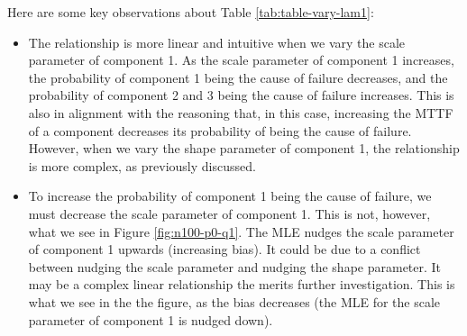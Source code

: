 \documentclass[
]{article}
\begin{document}
Here are some key observations about Table \ref{tab:table-vary-lam1}:

\begin{itemize}
\item
  The relationship is more linear and intuitive when we vary the scale
  parameter of component 1. As the scale parameter of component 1
  increases, the probability of component 1 being the cause of failure
  decreases, and the probability of component 2 and 3 being the cause of
  failure increases. This is also in alignment with the reasoning that,
  in this case, increasing the MTTF of a component decreases its
  probability of being the cause of failure. However, when we vary the
  shape parameter of component 1, the relationship is more complex, as
  previously discussed.
\item
  To increase the probability of component 1 being the cause of failure,
  we must decrease the scale parameter of component 1. This is not,
  however, what we see in Figure \ref{fig:n100-p0-q1}. The MLE nudges
  the scale parameter of component 1 upwards (increasing bias). It could
  be due to a conflict between nudging the scale parameter and nudging
  the shape parameter. It may be a complex linear relationship the
  merits further investigation. This is what we see in the the figure,
  as the bias decreases (the MLE for the scale parameter of component 1
  is nudged down).
\end{itemize}
\end{document}
